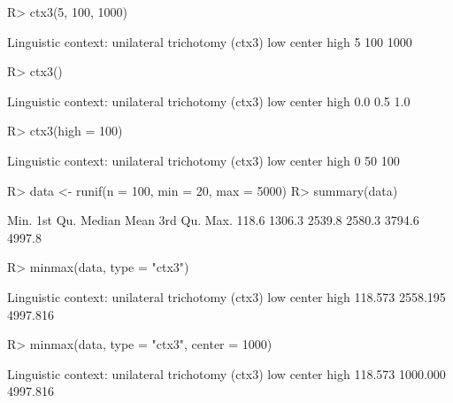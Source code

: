 \documentclass{article}\usepackage[]{graphicx}\usepackage[]{color}
\begin{document}
\begin{Schunk}
% --begin: "ctx"
\begin{Sinput}
R> ctx3(5, 100, 1000)
\end{Sinput}
\begin{Soutput}
Linguistic context: unilateral trichotomy (ctx3)
   low center   high 
     5    100   1000 
\end{Soutput}
\begin{Sinput}
R> ctx3()
\end{Sinput}
\begin{Soutput}
Linguistic context: unilateral trichotomy (ctx3)
   low center   high 
   0.0    0.5    1.0 
\end{Soutput}
\begin{Sinput}
R> ctx3(high = 100)
\end{Sinput}
\begin{Soutput}
Linguistic context: unilateral trichotomy (ctx3)
   low center   high 
     0     50    100 
\end{Soutput}
%
% --end: "ctx"
\end{Schunk}

\begin{Schunk}
% --begin: "minmax"
\begin{Sinput}
R> data <- runif(n = 100, min = 20, max = 5000)
R> summary(data)
\end{Sinput}
\begin{Soutput}
   Min. 1st Qu.  Median    Mean 3rd Qu.    Max. 
  118.6  1306.3  2539.8  2580.3  3794.6  4997.8 
\end{Soutput}
\begin{Sinput}
R> minmax(data, type = "ctx3")
\end{Sinput}
\begin{Soutput}
Linguistic context: unilateral trichotomy (ctx3)
     low   center     high 
 118.573 2558.195 4997.816 
\end{Soutput}
%
% --end: "minmax"
\end{Schunk}

\begin{Schunk}
% --begin: "minmax2"
\begin{Sinput}
R> minmax(data, type = "ctx3", center = 1000)
\end{Sinput}
\begin{Soutput}
Linguistic context: unilateral trichotomy (ctx3)
     low   center     high 
 118.573 1000.000 4997.816 
\end{Soutput}
%
% --end: "minmax2"
\end{Schunk}
\end{document}
